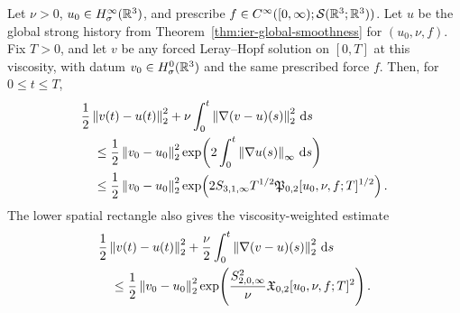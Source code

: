 \begin{theorem}
\label{thm:app-relative-energy}
Let \(\nu>0\), \(u_0\in H^\infty_\sigma(\mathbb R^3)\), and prescribe
\(f\in C^\infty([0,\infty);\mathcal S(\mathbb R^3;\mathbb R^3))\).  Let \(u\) be the
global strong history from Theorem~\ref{thm:ier-global-smoothness} for
\((u_0,\nu,f)\).  Fix \(T>0\), and let \(v\) be any forced Leray--Hopf
solution on \([0,T]\) at this viscosity, with datum
\(v_0\in H^0_\sigma(\mathbb R^3)\) and the same prescribed force \(f\).  Then,
for \(0\le t\le T\),
\begin{align}
 &\frac12\left\lVert v(t)-u(t)\right\rVert_2^2
 +\nu\int_0^t\left\lVert \nabla(v-u)(s)\right\rVert_2^2\,\mathrm d s
 \notag\\
 &\quad\le
 \frac12\left\lVert v_0-u_0\right\rVert_2^2
 \exp\!\left(
 2\int_0^t\left\lVert \nabla u(s)\right\rVert_\infty\,\mathrm d s
 \right)
 \label{eq:app-relative-energy-action}\\
 &\quad\le
 \frac12\left\lVert v_0-u_0\right\rVert_2^2
 \exp\!\left(
 2S_{3,1,\infty}T^{1/2}
 \mathfrak P_{0,2}[u_0,\nu,f;T]^{1/2}
 \right).
 \label{eq:app-relative-energy-producer}
\end{align}
The lower spatial rectangle also gives the viscosity-weighted estimate
\begin{align}
 &\frac12\left\lVert v(t)-u(t)\right\rVert_2^2
 +\frac\nu2\int_0^t\left\lVert \nabla(v-u)(s)\right\rVert_2^2\,\mathrm d s
 \notag\\
 &\quad\le
 \frac12\left\lVert v_0-u_0\right\rVert_2^2
 \exp\!\left(
 \frac{S_{2,0,\infty}^2}{\nu}
 \mathfrak X_{0,2}[u_0,\nu,f;T]^2
 \right).
 \label{eq:app-relative-energy-low-rectangle}
\end{align}
\end{theorem}

